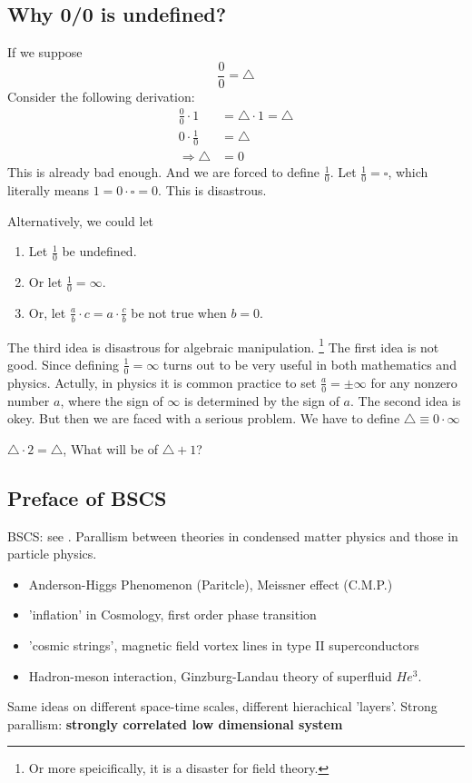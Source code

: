 \documentclass{article}
\numberwithin{equation}{subsection} %
\theoremstyle{definition}
\begin{document}
    \subsection{Why 0/0 is undefined?}
    If we suppose
    $$ \frac{0}{0}= \triangle $$
    Consider the following derivation:
    \begin{align}
	    \frac{0}{0} \cdot 1 &= \triangle \cdot 1 = \triangle \\
	    0 \cdot \frac{1}{0} &= \triangle\\
	    \Rightarrow \triangle &= 0
    \end{align}
    This is already bad enough. And we are forced to define $\frac{1}{0}$.
    Let $\frac{1}{0} = \square$, which literally means $1=0\cdot \square = 0$.
    This is disastrous.

    Alternatively, we could let
    \begin{enumerate}
	    \item Let $\frac{1}{0}$ be undefined.
	    \item Or let $\frac{1}{0} =
		    \infty$.
	    \item Or, let $\frac{a}{b}\cdot c= a\cdot \frac{c}{b}$ be not 
		    true when $b=0$.
    \end{enumerate}
    The third idea is disastrous for algebraic manipulation. \footnote{
    Or more speicifically, it is a disaster for field theory.
    }
    The first idea is not good. Since defining $\frac{1}{0}=\infty$ turns
    out to be very useful in both mathematics and physics. Actully, in
    physics it is common practice to set $\frac{a}{0}=\pm\infty$ for
    any nonzero number $a$, where the sign of $\infty$ is determined by 
    the sign of $a$.
    The second idea is okey. But then we are faced with a serious problem.
    We have to define $\triangle \equiv 0 \cdot \infty$

    $\triangle \cdot 2 = \triangle$, What will be of $\triangle + 1$?

    \subsection{Preface of BSCS}
        \label{sec:Preface_of_Bosonization_and_Strongly 
        Correlated_Systems}
    BSCS: see \cite{BSCS}.
    Parallism between theories in condensed matter physics and those in
    particle physics.
    \begin{itemize}
            \item Anderson-Higgs Phenomenon (Paritcle), Meissner effect
                    (C.M.P.)
            \item 'inflation' in Cosmology, first order phase transition
            \item 'cosmic strings', magnetic field vortex lines in type
                    II superconductors
            \item Hadron-meson interaction, Ginzburg-Landau theory of
                    superfluid $He^3$.
    \end{itemize}
    Same ideas on different space-time scales, different hierachical
    'layers'.
    Strong parallism: \textbf{strongly correlated low dimensional system}
\end{document}

